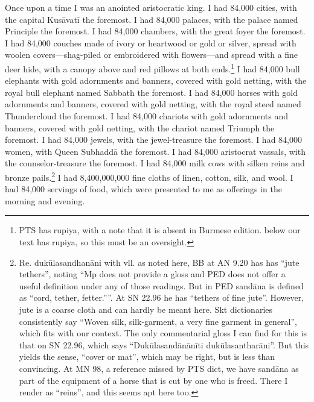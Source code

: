 \documentclass[12pt,openany]{book}%
\begin{document}
Once upon a time I was an anointed aristocratic king. I had 84,000 cities, with the capital \textsanskrit{Kusāvatī} the foremost. I had 84,000 palaces, with the palace named Principle the foremost. I had 84,000 chambers, with the great foyer the foremost. I had 84,000 couches made of ivory or heartwood or gold or silver, spread with woolen covers—shag-piled or embroidered with flowers—and spread with a fine deer hide, with a canopy above and red pillows at both ends.\footnote{PTS has rupiya, with a note that it is absent in Burmese edition. below our text has rupiya, so this must be an oversight. } I had 84,000 bull elephants with gold adornments and banners, covered with gold netting, with the royal bull elephant named Sabbath the foremost. I had 84,000 horses with gold adornments and banners, covered with gold netting, with the royal steed named Thundercloud the foremost. I had 84,000 chariots with gold adornments and banners, covered with gold netting, with the chariot named Triumph the foremost. I had 84,000 jewels, with the jewel-treasure the foremost. I had 84,000 women, with Queen \textsanskrit{Subhaddā} the foremost. I had 84,000 aristocrat vassals, with the counselor-treasure the foremost. I had 84,000 milk cows with silken reins and bronze pails.\footnote{Re. \textsanskrit{dukūlasandhanāni} with vll. as noted here, BB at AN 9.20 has has “jute tethers”, noting “Mp does not provide a gloss and PED does not offer a useful definition under any of those readings. But in PED \textsanskrit{sandāna} is defined as “cord, tether, fetter.””. At SN 22.96 he has “tethers of fine jute”. However, jute is a coarse cloth and can hardly be meant here. Skt dictionaries consistently say “Woven silk, silk-garment, a very fine garment in general”, which fits with our context. The only commentarial gloss I can find for this is that on SN 22.96, which says “\textsanskrit{Dukūlasandānānīti} \textsanskrit{dukūlasantharāni}”. But this yields the sense, “cover or mat”, which may be right, but is less than convincing. At MN 98, a reference missed by PTS dict, we have \textsanskrit{sandāna} as part of the equipment of a horse that is cut by one who is freed. There I render as “reins”, and this seems apt here too. } I had 8,400,000,000 fine cloths of linen, cotton, silk, and wool. I had 84,000 servings of food, which were presented to me as offerings in the morning and evening. 
\end{document}
